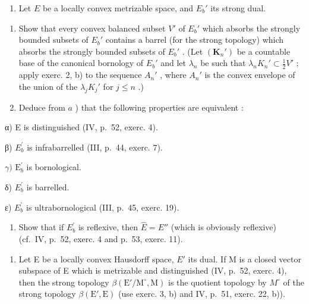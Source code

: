 \begin{enumerate}
\def\labelenumi{\arabic{enumi})}
\setcounter{enumi}{2}
\tightlist
\item
  Let \(E\) be a locally convex metrizable space, and \(E_b'\) its strong dual.
\end{enumerate}

\begin{enumerate}
\def\labelenumi{\alph{enumi})}
\item
  Show that every convex balanced subset \(V'\) of \(E_{b}'\) which absorbs the strongly bounded subsets of \(E_{b}'\) contains a barrel (for the strong topology) which absorbs the strongly bounded subsets of \(E_{b}'\) . (Let \((\mathbf{K}_{n}')\) be a countable base of the canonical bornology of \(E_{b}'\) and let \(\lambda_{n}\) be such that \(\lambda_{n}K_{n}' \subset \frac{1}{2}V'\) ; apply exerc. 2, b) to the sequence \(A_{n}'\) , where \(A_{n}'\) is the convex envelope of the union of the \(\lambda_{j}K_{j}'\) for \(j \leqslant n\) .)
\item
  Deduce from \(a\) ) that the following properties are equivalent :
\end{enumerate}

α) E is distinguished (IV, p.~52, exerc. 4).

β) \(E_{b}^{\prime}\) is infrabarrelled (III, p.~44, exerc. 7).

\(\gamma)\) \(\mathrm{E}_b^{\prime}\) is bornological.

δ) \(E_{b}^{\prime}\) is barrelled.

ε) \(E_{b}^{\prime}\) is ultrabornological (III, p.~45, exerc. 19).

\begin{enumerate}
\def\labelenumi{\alph{enumi})}
\setcounter{enumi}{2}
\tightlist
\item
  Show that if \(E_{b}^{\prime}\) is reflexive, then \(\hat{E} = E''\) (which is obviously reflexive) (cf.~IV, p.~52, exerc. 4 and p.~53, exerc. 11).
\end{enumerate}

\begin{enumerate}
\def\labelenumi{\arabic{enumi})}
\setcounter{enumi}{3}
\tightlist
\item
  Let E be a locally convex Hausdorff space, \(E'\) its dual. If M is a closed vector subspace of E which is metrizable and distinguished (IV, p.~52, exerc. 4), then the strong topology \(\beta(\mathrm{E}'/\mathrm{M}^{\circ}, \mathrm{M})\) is the quotient topology by \(M^{\circ}\) of the strong topology \(\beta(\mathrm{E}', \mathrm{E})\) (use exerc. 3, b) and IV, p.~51, exerc. 22, b)).
\end{enumerate}

